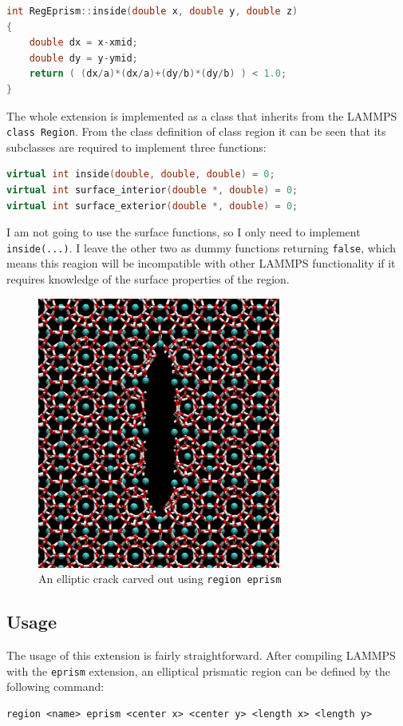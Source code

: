 \begin{lstlisting}[language=c++]
int RegEprism::inside(double x, double y, double z) 
{
	double dx = x-xmid;
	double dy = y-ymid;
	return ( (dx/a)*(dx/a)+(dy/b)*(dy/b) ) < 1.0;
}
\end{lstlisting}
The whole extension is implemented as a class that inherits from the LAMMPS {\tt class Region}. From the class definition of class region it can be seen that its subclasses are required to implement three functions:

\begin{lstlisting}[language=c++]
virtual int inside(double, double, double) = 0;
virtual int surface_interior(double *, double) = 0;
virtual int surface_exterior(double *, double) = 0;
\end{lstlisting}
I am not going to use the surface functions, so I only need to implement {\tt inside(...)}. I leave the other two as dummy functions returning {\tt false}, which means this reagion will be incompatible with other LAMMPS functionality if it requires knowledge of the surface properties of the region.

\begin{figure}
\centering
\includegraphics[width=8cm]{../snapshots/carved_crack.pdf}
\caption{An elliptic crack carved out using {\tt region eprism}}
\end{figure}


\subsection{Usage}
The usage of this extension is fairly straightforward. After compiling LAMMPS with the {\tt eprism} extension, an elliptical prismatic region can be defined by the following command:
\begin{lstlisting}[language=LammpsInput]
region <name> eprism <center x> <center y> <length x> <length y>
\end{lstlisting}

